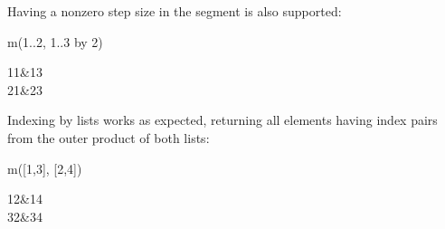 {{{{{{{{{{{{{{{{{{\begin{xtc}
\begin{xtccomment}
Having a nonzero step size in the segment is also supported:
\end{xtccomment}
\begin{spadsrc}
m(1..2, 1..3 by 2) 
\end{spadsrc}
\begin{TeXOutput}
\begin{fricasmath}{3}
\begin{MATRIX}{2}11&13\\21&23\end{MATRIX}%
\end{fricasmath}
\end{TeXOutput}
\end{xtc}

\begin{xtc}
\begin{xtccomment}
Indexing by lists works as expected, returning all elements having index pairs
from the outer product of both lists:
\end{xtccomment}
\begin{spadsrc}
m([1,3], [2,4]) 
\end{spadsrc}
\begin{TeXOutput}
\begin{fricasmath}{4}
\begin{MATRIX}{2}12&14\\32&34\end{MATRIX}%
\end{fricasmath}
\end{TeXOutput}
\end{xtc}

}}}}}}}}}}}}}}}}}}
